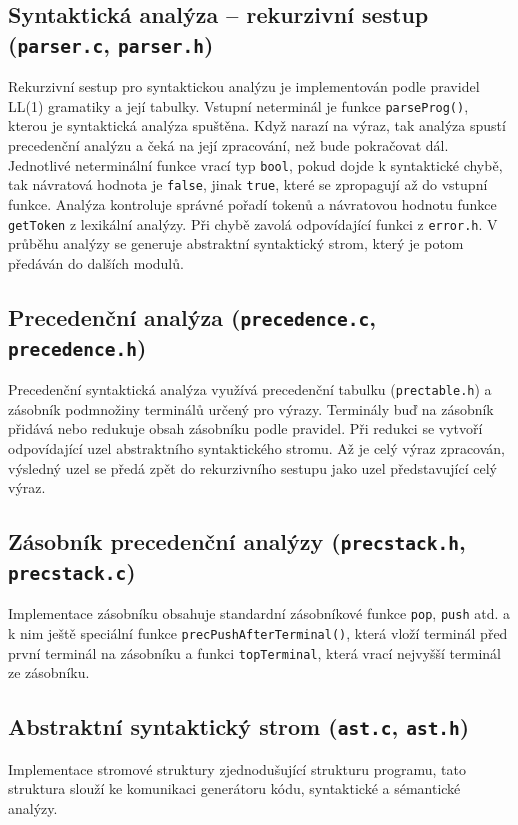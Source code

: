 \documentclass[12pt, a4paper]{article}
\begin{document}
\subsection{Syntaktická analýza -- rekurzivní sestup (\texttt{parser.c}, \texttt{parser.h})}
Rekurzivní sestup pro syntaktickou analýzu je implementován podle pravidel LL(1) gramatiky a její tabulky. Vstupní neterminál je funkce \texttt{parseProg()}, kterou je syntaktická analýza spuštěna. Když narazí na výraz, tak analýza spustí precedenční analýzu a čeká na její zpracování, než bude pokračovat dál. Jednotlivé neterminální funkce vrací typ \texttt{bool}, pokud dojde k syntaktické chybě, tak návratová hodnota je \texttt{false}, jinak \texttt{true}, které se zpropagují až do vstupní funkce. Analýza kontroluje správné pořadí tokenů a návratovou hodnotu funkce \texttt{getToken} z lexikální analýzy. Při chybě zavolá odpovídající funkci z \texttt{error.h}. V průběhu analýzy se generuje abstraktní syntaktický strom, který je potom předáván do dalších modulů.

\subsection{Precedenční analýza (\texttt{precedence.c}, \texttt{precedence.h})}
Precedenční syntaktická analýza využívá precedenční tabulku (\texttt{prectable.h}) a zásobník podmnožiny terminálů určený pro výrazy. Terminály buď na zásobník přidává nebo redukuje obsah zásobníku podle pravidel. Při redukci se vytvoří odpovídající uzel abstraktního syntaktického stromu. Až je celý výraz zpracován, výsledný uzel se předá zpět do rekurzivního sestupu jako uzel představující celý výraz.

\subsection{Zásobník precedenční analýzy (\texttt{precstack.h}, \texttt{precstack.c})}
Implementace zásobníku obsahuje standardní zásobníkové funkce \texttt{pop}, \texttt{push} atd. a k nim ještě speciální funkce \texttt{precPushAfterTerminal()}, která vloží terminál před první terminál na zásobníku a funkci \texttt{topTerminal}, která vrací nejvyšší terminál ze zásobníku.

\subsection{Abstraktní syntaktický strom (\texttt{ast.c}, \texttt{ast.h})}
Implementace stromové struktury zjednodušující strukturu programu, tato struktura slouží ke komunikaci generátoru kódu, syntaktické a sémantické analýzy.
\end{document}
